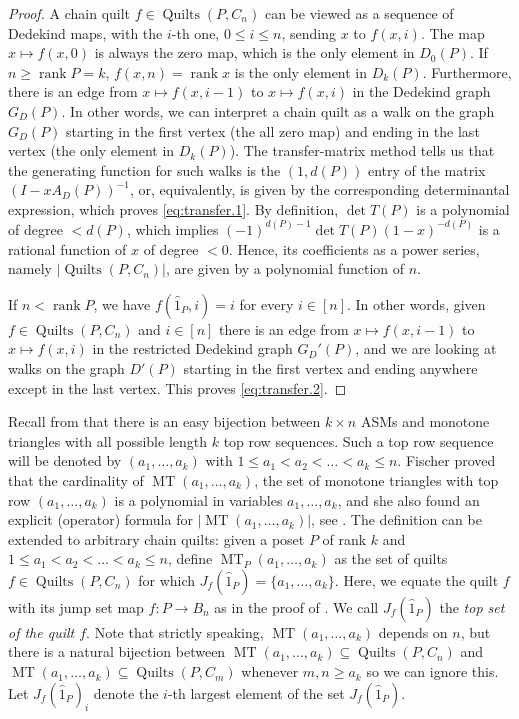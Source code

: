 \documentclass[12pt]{amsart}
\numberwithin{equation}{section}
\theoremstyle{definition}
\newcommand{\MT}{\operatorname{MT}}
\newcommand{\quilt}{\operatorname{Quilts}}
\newcommand{\rank}{\operatorname{rank}}
\begin{document}
\begin{proof}
A chain quilt $f \in \quilt(P,C_n)$ can be viewed as a sequence of
Dedekind maps, with the $i$-th one, $0 \leq i \leq n$, sending $x$ to
$f(x,i)$. The map $x \mapsto f(x,0)$ is always the zero map, which is
the only element in $D_0(P)$. If $n \geq \rank P = k$, $f(x,n)=\rank
x$ is the only element in $D_k(P)$. Furthermore, there is an edge from
$x \mapsto f(x,i-1)$ to $x \mapsto f(x,i)$ in the Dedekind graph
$G_D(P)$. In other words, we can interpret a chain quilt as a walk on
the graph $G_D(P)$ starting in the first vertex (the all zero map) and
ending in the last vertex (the only element in $D_k(P)$). The
transfer-matrix method \cite[Thm. 4.7.2]{ec1} tells us that the
generating function for such walks is the $(1,d(P))$ entry of the
matrix $(I - x A_D(P))^{-1}$, or, equivalently, is given by the
corresponding determinantal expression, which proves
\eqref{eq:transfer.1}. By definition, $\det T(P)$ is a polynomial of
degree $< d(P)$, which implies $(-1)^{d(P)-1} \det T(P) (1-x)^{-d(P)}$
is a rational function of $x$ of degree $< 0$.  Hence, its coefficients
as a power series, namely $|\quilt(P, C_n)|$, are given by a
polynomial function of $n$.

If $n < \rank P$, we have $f(\hat 1_P,i) = i$ for every $i
\in [n]$. In other words, given $f \in \quilt(P,C_n)$ and $i\in [n]$
there is an edge from $x \mapsto f(x,i-1)$ to $x \mapsto f(x,i)$ in
the restricted Dedekind graph $G_D'(P)$, and we are looking at walks
on the graph $D'(P)$ starting in the first vertex and ending anywhere
except in the last vertex. This proves \eqref{eq:transfer.2}.
\end{proof}

Recall from  that there is an easy bijection
between $k \times n$ ASMs and monotone triangles with all possible
length $k$ top row sequences.  Such a top row sequence will be denoted
by $(a_1,\ldots,a_k)$ with $1 \leq a_1 < a_2 < \dots < a_k \leq
n$. Fischer proved that the cardinality of $\MT(a_1,\ldots,a_k)$, the
set of monotone triangles with top row $(a_1,\ldots,a_k)$ is a
polynomial in variables $a_1,\ldots,a_k$, and she also found an
explicit (operator) formula for $|\MT(a_1,\ldots,a_k)|$, see
\cite{MTs}. The definition can be extended to arbitrary chain quilts:
given a poset $P$ of rank $k$ and $1 \leq a_1 < a_2 < \dots < a_k \leq
n$, define $\MT_P(a_1,\ldots,a_k)$ as the set of quilts $f \in
\quilt(P,C_n)$ for which $J_f(\hat 1_P) = \{a_1,\ldots,a_k\}$.  Here, we
equate the quilt $f$ with its jump set map $f:P \longrightarrow B_{n}$
as in the proof of .  We call $J_f(\hat 1_P)$
the \emph{top set of the quilt $f$}. Note that strictly speaking,
$\MT(a_1,\ldots,a_k)$ depends on $n$, but there is a natural bijection
between $\MT(a_1,\ldots,a_k) \subseteq \quilt(P,C_n)$ and
$\MT(a_1,\ldots,a_k) \subseteq \quilt(P,C_m)$ whenever $m,n \geq a_k$
so we can ignore this.   Let $J_f(\hat 1_P)_i$ denote the
$i$-th largest element of the set $J_f(\hat 1_P)$.
\end{document}
